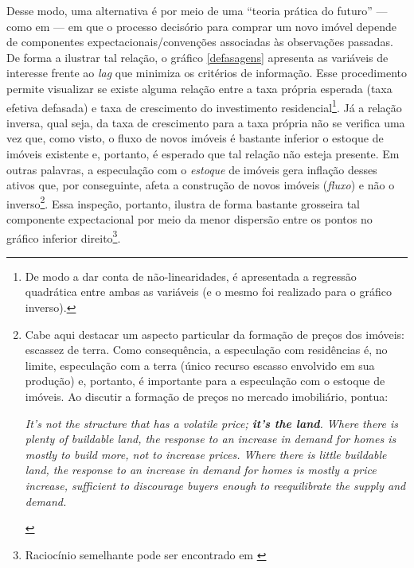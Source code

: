Desse modo, uma alternativa é por meio de uma ``teoria prática do futuro'' --- como em \textcite[p.~214]{keynes_general_1937} --- em que o processo decisório para comprar um novo imóvel depende de componentes expectacionais/convenções associadas às observações passadas.
De forma a ilustrar tal relação, o gráfico \ref{defasagens} apresenta as variáveis de interesse frente ao \textit{lag} que minimiza os critérios de informação. Esse procedimento permite visualizar se existe alguma relação entre a taxa própria esperada (taxa efetiva defasada) e taxa de crescimento do investimento residencial\footnote{De modo a dar conta de não-linearidades, é apresentada a regressão quadrática entre ambas as variáveis (e o mesmo foi realizado para o gráfico inverso).}. Já a relação inversa, qual seja, da taxa de crescimento para a taxa própria não se verifica uma vez que, como visto, o fluxo de novos imóveis é bastante inferior o estoque de imóveis existente e, portanto, é esperado que tal relação não esteja presente. Em outras palavras, a especulação com o \textit{estoque}  de imóveis gera inflação desses ativos que, por conseguinte, afeta a construção de novos imóveis (\textit{fluxo}) e não o inverso\footnote{
	Cabe aqui destacar um aspecto particular da formação de preços dos imóveis: escassez de terra. Como consequência, a especulação com residências é, no limite, especulação com a terra (único recurso escasso envolvido em sua produção) e, portanto, é importante para a especulação com o estoque de imóveis. Ao discutir a formação de preços no mercado imobiliário, \textcite[p.~349, grifos adicionados]{leamer_housing_2007} pontua:
	
	\begin{citacao}
	\textit{It’s not the structure that has a volatile price; \textbf{it's the land}. Where there is plenty of buildable land, the response to an increase in demand for homes is mostly to build more, not to increase prices. Where there is little buildable land, the response to an increase in demand for homes is mostly a price increase, sufficient to discourage buyers enough to reequilibrate the supply and demand.}
	\end{citacao}	
}. 
Essa inspeção, portanto, ilustra de forma bastante grosseira tal componente expectacional por meio da menor dispersão entre os pontos no gráfico inferior direito\footnote{Raciocínio semelhante pode ser encontrado em \textcite{girardi_autonomous_2015}}.  


